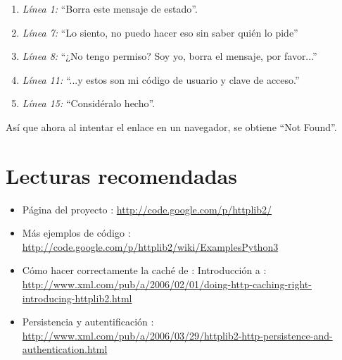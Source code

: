 \begin{enumerate}

\item \emph{Línea 1:} ``Borra este mensaje de estado''.

\item \emph{Línea 7:} ``Lo siento, no puedo hacer eso sin saber quién lo pide''

\item \emph{Línea 8:} ``¿No tengo permiso? Soy yo, borra el mensaje, por favor...''

\item \emph{Línea 11:} ``...y estos son mi código de usuario y clave de acceso.''

\item \emph{Línea 15:} ``Considéralo hecho''.

\end{enumerate}


Así que ahora al intentar el enlace  en un navegador, se obtiene ``Not Found''.

\section{Lecturas recomendadas}


\noindent {}

\begin{itemize}

\item Página del proyecto : \newline \href{http://code.google.com/p/httplib2/}{http://code.google.com/p/httplib2/}

\item Más ejemplos de código : \newline \href{http://code.google.com/p/httplib2/wiki/ExamplesPython3}{http://code.google.com/p/httplib2/wiki/ExamplesPython3}

\item Cómo hacer correctamente la caché de : Introducción a : \newline \href{http://www.xml.com/pub/a/2006/02/01/doing-http-caching-right-introducing-httplib2.html}{http://www.xml.com/pub/a/2006/02/01/doing-http-caching-right-introducing-httplib2.html}

\item {} Persistencia y autentificación : \newline \href{http://www.xml.com/pub/a/2006/03/29/httplib2-http-persistence-and-authentication.html}{http://www.xml.com/pub/a/2006/03/29/httplib2-http-persistence-and-authentication.html}

\end{itemize} 

